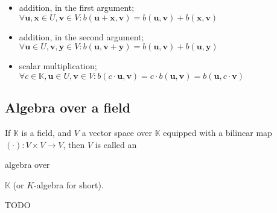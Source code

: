 \documentclass{article}
\newenvironment{itemized}{ 
\begin{itemize}
\setlength{\itemsep}{0pt}
\setlength{\parskip}{0pt}
\setlength{\parsep}{0pt}     
}{\end{itemize}}
\renewcommand{\vec}[1]{\mathbf{#1}}
\begin{document}
  \begin{itemized}
    \item addition, in the first argument; $ \forall \vec{u}, \vec{x} \in U, \vec{v} \in V : b(\vec{u} + \vec{x}, \vec{v}) = b(\vec{u}, \vec{v}) + b(\vec{x}, \vec{v}) $
    \item addition, in the second argument; $ \forall \vec{u} \in U, \vec{v}, \vec{y} \in V : b(\vec{u}, \vec{v} + \vec{y}) = b(\vec{u}, \vec{v}) + b(\vec{u}, \vec{y}) $
    \item scalar multiplication; $ \forall c \in \mathbb{K}, \vec{u} \in U, \vec{v} \in V : b(c \cdot \vec{u}, \vec{v}) = c \cdot b(\vec{u}, \vec{v}) = b(\vec{u}, c \cdot \vec{v}) $
  \end{itemized}

\subsection*{Algebra over a field}

If $\mathbb{K}$ is a field, and $V$ a vector space over $\mathbb{K}$ equipped with a bilinear map $(\cdot) : V \times V \rightarrow V$, then $V$ is called an \begin{em}algebra over\end{em} $\mathbb{K}$ (or $K$-algebra for short).

  TODO
\end{document}
